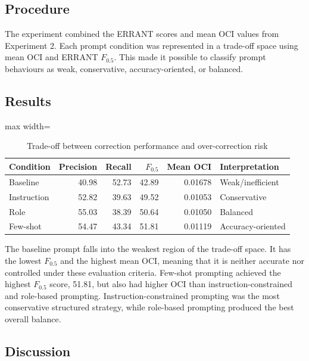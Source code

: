 \subsection{Procedure}

The experiment combined the ERRANT scores and mean OCI values from Experiment 2. Each prompt condition was represented in a trade-off space using mean OCI and ERRANT $F_{0.5}$. This made it possible to classify prompt behaviours as weak, conservative, accuracy-oriented, or balanced.

\subsection{Results}

\begin{table}[htbp]
    \centering
    \caption{Trade-off between correction performance and over-correction risk}
    \label{tab:exp5_tradeoff}
    \renewcommand{\arraystretch}{1.15}
    \begin{adjustbox}{max width=\textwidth}
    \begin{tabular}{lrrrrl}
        \toprule
        \textbf{Condition} & \textbf{Precision} & \textbf{Recall} & \textbf{$F_{0.5}$} & \textbf{Mean OCI} & \textbf{Interpretation} \\
        \midrule
        Baseline    & 40.98 & 52.73 & 42.89 & 0.01678 & Weak/inefficient \\
        Instruction & 52.82 & 39.63 & 49.52 & 0.01053 & Conservative \\
        Role        & 55.03 & 38.39 & 50.64 & 0.01050 & Balanced \\
        Few-shot    & 54.47 & 43.34 & 51.81 & 0.01119 & Accuracy-oriented \\
        \bottomrule
    \end{tabular}
    \end{adjustbox}
\end{table}

The baseline prompt falls into the weakest region of the trade-off space. It has the lowest $F_{0.5}$ and the highest mean OCI, meaning that it is neither accurate nor controlled under these evaluation criteria. Few-shot prompting achieved the highest $F_{0.5}$ score, 51.81, but also had higher OCI than instruction-constrained and role-based prompting. Instruction-constrained prompting was the most conservative structured strategy, while role-based prompting produced the best overall balance.

\subsection{Discussion}

